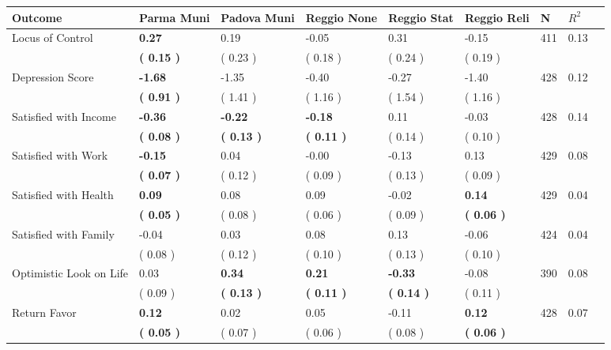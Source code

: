 \begin{tabular}{L{6.2cm} C{1.8cm} C{1.8cm} C{1.8cm} C{1.8cm} C{1.8cm} C{1.8cm} C{0.3cm} C{0.3cm}}
\toprule
 \textbf{Outcome} & \textbf{Parma Muni} & \textbf{Padova Muni} & \textbf{Reggio None} & \textbf{Reggio Stat} & \textbf{Reggio Reli} & \textbf{N} & \textbf{$ R^2$} \\
\midrule
Locus of Control & \textbf{     0.27} &      0.19 &     -0.05 &      0.31 &     -0.15  & 411 &       0.13 \\ 
 & \textbf{(     0.15 )} & (     0.23 ) & (     0.18 ) & (     0.24 ) & (     0.19 )  & \\
Depression Score & \textbf{    -1.68} &     -1.35 &     -0.40 &     -0.27 &     -1.40  & 428 &       0.12 \\ 
 & \textbf{(     0.91 )} & (     1.41 ) & (     1.16 ) & (     1.54 ) & (     1.16 )  & \\
Satisfied with Income & \textbf{    -0.36} & \textbf{    -0.22} & \textbf{    -0.18} &      0.11 &     -0.03  & 428 &       0.14 \\ 
 & \textbf{(     0.08 )} & \textbf{(     0.13 )} & \textbf{(     0.11 )} & (     0.14 ) & (     0.10 )  & \\
Satisfied with Work & \textbf{    -0.15} &      0.04 &     -0.00 &     -0.13 &      0.13  & 429 &       0.08 \\ 
 & \textbf{(     0.07 )} & (     0.12 ) & (     0.09 ) & (     0.13 ) & (     0.09 )  & \\
Satisfied with Health & \textbf{     0.09} &      0.08 &      0.09 &     -0.02 & \textbf{     0.14}  & 429 &       0.04 \\ 
 & \textbf{(     0.05 )} & (     0.08 ) & (     0.06 ) & (     0.09 ) & \textbf{(     0.06 )}  & \\
Satisfied with Family &     -0.04 &      0.03 &      0.08 &      0.13 &     -0.06  & 424 &       0.04 \\ 
 & (     0.08 ) & (     0.12 ) & (     0.10 ) & (     0.13 ) & (     0.10 )  & \\
Optimistic Look on Life &      0.03 & \textbf{     0.34} & \textbf{     0.21} & \textbf{    -0.33} &     -0.08  & 390 &       0.08 \\ 
 & (     0.09 ) & \textbf{(     0.13 )} & \textbf{(     0.11 )} & \textbf{(     0.14 )} & (     0.11 )  & \\
Return Favor & \textbf{     0.12} &      0.02 &      0.05 &     -0.11 & \textbf{     0.12}  & 428 &       0.07 \\ 
 & \textbf{(     0.05 )} & (     0.07 ) & (     0.06 ) & (     0.08 ) & \textbf{(     0.06 )}  & \\

\end{tabular}
